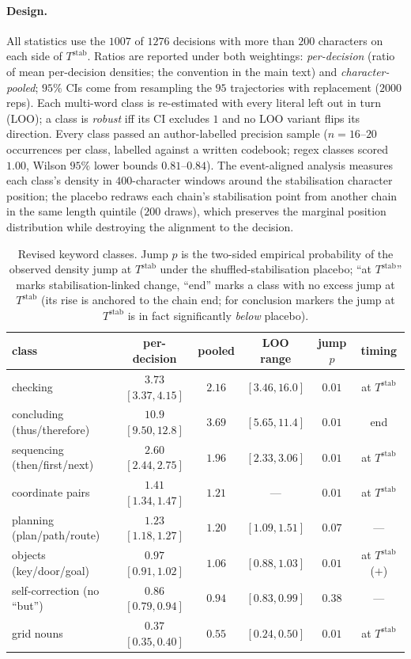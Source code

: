 \documentclass{article}
\newcommand{\Tstab}{T^{\mathrm{stab}}}
\begin{document}
\paragraph{Design.} All statistics use the $1007$ of $1276$ decisions with more than
$200$ characters on each side of $\Tstab$. Ratios are reported under both weightings:
\emph{per-decision} (ratio of mean per-decision densities; the convention in the main
text) and \emph{character-pooled}; $95\%$ CIs come from resampling the $95$ trajectories
with replacement ($2000$ reps). Each multi-word class is re-estimated with every literal
left out in turn (LOO); a class is \emph{robust} iff its CI excludes $1$ and no LOO
variant flips its direction. Every class passed an author-labelled precision sample
($n = 16$--$20$ occurrences per class, labelled against a written codebook; regex classes
scored $1.00$, Wilson $95\%$ lower bounds $0.81$--$0.84$). The event-aligned analysis
measures each class's density in $400$-character windows around the stabilisation
character position; the placebo redraws each chain's stabilisation point from another
chain in the same length quintile ($200$ draws), which preserves the marginal position
distribution while destroying the alignment to the decision.

\begin{table}[h]
  \centering
  \caption{Revised keyword classes. Jump $p$ is the two-sided empirical probability of
  the observed density jump at $\Tstab$ under the shuffled-stabilisation placebo;
  ``at $\Tstab$'' marks stabilisation-linked change, ``end'' marks a class with no
  excess jump at $\Tstab$ (its rise is anchored to the chain end; for conclusion
  markers the jump at $\Tstab$ is in fact significantly \emph{below} placebo).}
  \label{tab:lexicon}
  \small
  \begin{tabular}{lccccc}
    \toprule
    class & per-decision & pooled & LOO range & jump $p$ & timing \\
    \midrule
    checking & $3.73$ $[3.37, 4.15]$ & $2.16$ & $[3.46, 16.0]$ & $0.01$ & at $\Tstab$ \\
    concluding (thus/therefore) & $10.9$ $[9.50, 12.8]$ & $3.69$ & $[5.65, 11.4]$ & $0.01$ & end \\
    sequencing (then/first/next) & $2.60$ $[2.44, 2.75]$ & $1.96$ & $[2.33, 3.06]$ & $0.01$ & at $\Tstab$ \\
    coordinate pairs & $1.41$ $[1.34, 1.47]$ & $1.21$ & --- & $0.01$ & at $\Tstab$ \\
    planning (plan/path/route) & $1.23$ $[1.18, 1.27]$ & $1.20$ & $[1.09, 1.51]$ & $0.07$ & --- \\
    objects (key/door/goal) & $0.97$ $[0.91, 1.02]$ & $1.06$ & $[0.88, 1.03]$ & $0.01$ & at $\Tstab$ ($+$) \\
    self-correction (no ``but'') & $0.86$ $[0.79, 0.94]$ & $0.94$ & $[0.83, 0.99]$ & $0.38$ & --- \\
    grid nouns & $0.37$ $[0.35, 0.40]$ & $0.55$ & $[0.24, 0.50]$ & $0.01$ & at $\Tstab$ \\
    \bottomrule
  \end{tabular}
\end{table}
\end{document}
